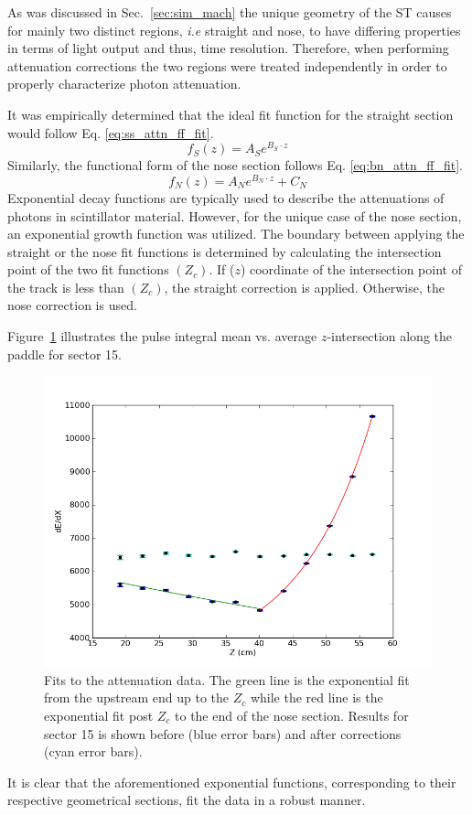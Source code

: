 As was discussed in Sec.~\ref{sec:sim_mach} the unique geometry of the ST causes for mainly two distinct regions, \textit{i.e} straight and nose, to have differing properties in terms of light output and thus, time resolution.  Therefore, when performing attenuation corrections the two regions were treated independently in order to properly characterize photon attenuation.  

It was empirically determined that the ideal fit function for the straight section would follow Eq. \ref{eq:ss_attn_ff_fit}.
	\begin{equation} \label{eq:ss_attn_ff_fit}
		f_{S}(z) = A_{S}e^{B_{S} \cdot z}
	\end{equation}
Similarly, the functional form of the nose section follows Eq. \ref{eq:bn_attn_ff_fit}.
	\begin{equation} \label{eq:bn_attn_ff_fit}
		f_{N}(z) = A_{N}e^{B_{N} \cdot z} + C_{N}
	\end{equation}
Exponential decay functions are typically used to describe the attenuations of photons in scintillator material.  However, for the unique case of the nose section, an exponential growth function was utilized. The boundary between applying the straight or the nose fit functions is determined by calculating the intersection point of the two fit functions $(Z_c)$. If ($z$) coordinate of the intersection point of the track is less than  $(Z_c)$, the straight correction is applied. Otherwise, the nose correction is used.

Figure~\ref{fig:attfits} illustrates the pulse integral mean vs. average $z$-intersection along the paddle for sector 15.  
\begin{figure}[!htb]
	\centering
	\includegraphics[width=1.0\columnwidth]{calibration/figs/Paddle15_MPV_Z.png}
	\caption{Fits to the attenuation data.  The green line is the exponential fit from the upstream end up to the $Z_c$ while the red line is the exponential fit post $Z_c$ to the end of the nose section.  Results for sector 15 is shown before (blue error bars) and after corrections (cyan error bars).}
	\label{fig:attfits}
\end{figure}
It is clear that the aforementioned exponential functions, corresponding to their respective geometrical sections, fit the data in a robust manner. 


